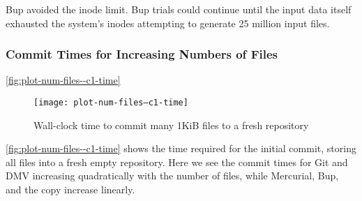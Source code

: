Bup avoided the \gls{inode} limit.
Bup trials could continue until the input data itself exhausted the system's \glspl{inode} attempting to generate \num{25} million input files.

%


\subsubsection{Commit Times for Increasing Numbers of Files}

\autoref{fig:plot-num-files--c1-time}

\begin{figure}[p]
    \caption{Wall-clock time to commit many 1KiB files to a fresh repository}
    \label{fig:plot-num-files--c1-time}
    \centering

    \explainlogsubfig

    \texttt{[image: plot-num-files--c1-time]}
\end{figure}

\autoref{fig:plot-num-files--c1-time} shows the time required for the initial \gls{commit}, storing all files into a fresh empty \gls{repository}.
Here we see the commit times for Git and DMV increasing quadratically with the number of files, while Mercurial, Bup, and the copy increase linearly.
